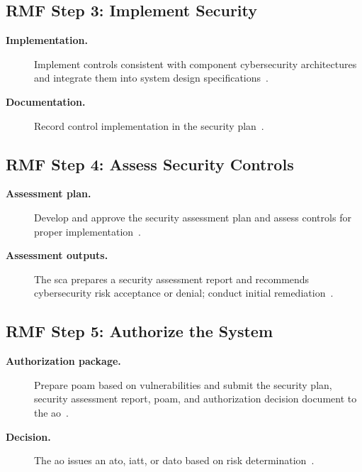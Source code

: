 \documentclass[../main.tex]{subfiles}
\begin{document}
\subsection{RMF Step 3: Implement Security}
\begin{description}
  \item[\textbf{Implementation.}] Implement controls consistent with component cybersecurity architectures and integrate them into system design specifications~\autocite{edo-3-4-3-cybersecurity-awareness-2025}.
  \item[\textbf{Documentation.}] Record control implementation in the security plan~\autocite{edo-3-4-3-cybersecurity-awareness-2025}.
\end{description}

\subsection{RMF Step 4: Assess Security Controls}
\begin{description}
  \item[\textbf{Assessment plan.}] Develop and approve the security assessment plan and assess controls for proper implementation~\autocite{edo-3-4-3-cybersecurity-awareness-2025}.
  \item[\textbf{Assessment outputs.}] The \ac{sca} prepares a security assessment report and recommends cybersecurity risk acceptance or denial; conduct initial remediation~\autocite{DoDI8510-01,edo-3-4-3-cybersecurity-awareness-2025}.
\end{description}

\subsection{RMF Step 5: Authorize the System}
\begin{description}
  \item[\textbf{Authorization package.}] Prepare \ac{poam} based on vulnerabilities and submit the security plan, security assessment report, \ac{poam}, and authorization decision document to the \ac{ao}~\autocite{DoDI8510-01,edo-3-4-3-cybersecurity-awareness-2025}.
  \item[\textbf{Decision.}] The \ac{ao} issues an \ac{ato}, \ac{iatt}, or \ac{dato} based on risk determination~\autocite{edo-3-4-3-cybersecurity-awareness-2025}.
\end{description}
\end{document}
